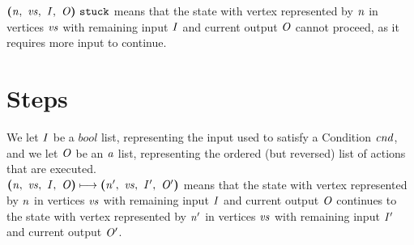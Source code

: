 \documentclass[12pt]{article}
\begin{document}
$\stuck{\cfg{\nterm{n}}{\nterm{vs}}{\nterm{I}}{\nterm{O}}}$ means that the
state with vertex represented by $\nterm{n}$ in vertices $\nterm{vs}$ with
remaining input $\nterm{I}$ and current output $\nterm{O}$ cannot proceed, as it
requires more input to continue.

\begin{mathpar}

\end{mathpar}

\section{Steps}

We let $\nterm{I}$ be a $bool$ list, representing the input used to satisfy a
Condition $\nterm{cnd}$, and we let $\nterm{O}$ be an $\nterm{a}$ list,
representing the ordered (but reversed) list of actions that are executed.\\

$\steps{
  \cfg{\nterm{n}}{\nterm{vs}}{\nterm{I}}{\nterm{O}}
}{
  \cfg{\nterm{n'}}{\nterm{vs}}{\nterm{I'}}{\nterm{O'}}
}$ means that the state with vertex represented by $\nterm{n}$ in vertices
$\nterm{vs}$ with remaining input $\nterm{I}$ and current output $\nterm{O}$
continues to the state with vertex represented by $\nterm{n'}$ in vertices
$\nterm{vs}$ with remaining input $\nterm{I'}$ and current output $\nterm{O'}$.
\end{document}

